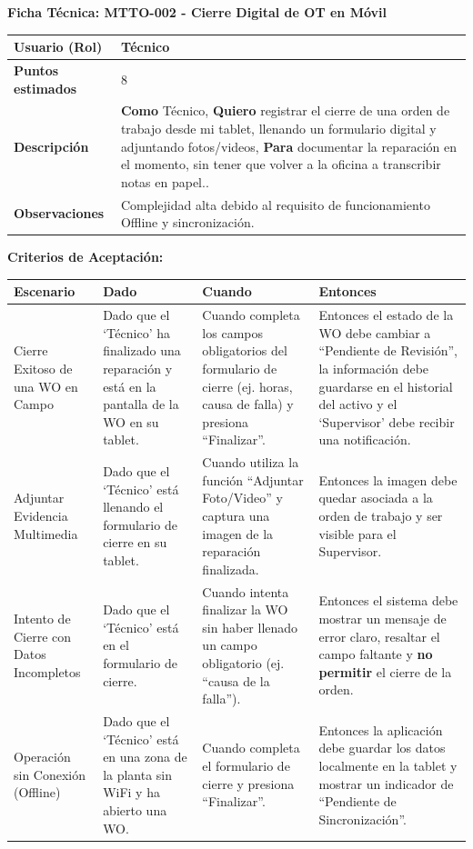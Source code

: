 \noindent
\textbf{Ficha Técnica: MTTO-002 - Cierre Digital de OT en Móvil}
\footnotesize
\begin{longtable}{|p{}|p{}|}
\hline
\textbf{Usuario (Rol)} & Técnico \\ \hline
\textbf{Puntos estimados} & 8 \\ \hline
\textbf{Descripción} & \textbf{Como} Técnico, \textbf{Quiero} registrar el cierre de una orden de trabajo desde mi tablet, llenando un formulario digital y adjuntando fotos/videos, \textbf{Para} documentar la reparación en el momento, sin tener que volver a la oficina a transcribir notas en papel.. \\ \hline
\textbf{Observaciones} & Complejidad alta debido al requisito de funcionamiento Offline y sincronización. \\ \hline
\end{longtable}
\normalsize

\noindent
\textbf{Criterios de Aceptación:}
\footnotesize
\begin{longtable}{|p{}|p{}|p{}|p{}|}
\hline
\textbf{Escenario} & \textbf{Dado} & \textbf{Cuando} & \textbf{Entonces} \\ \hline
\endhead
Cierre Exitoso de una WO en Campo & Dado que el `Técnico' ha finalizado una reparación y está en la pantalla de la WO en su tablet. & Cuando completa los campos obligatorios del formulario de cierre (ej. horas, causa de falla) y presiona ``Finalizar''. & Entonces el estado de la WO debe cambiar a ``Pendiente de Revisión'', la información debe guardarse en el historial del activo y el `Supervisor' debe recibir una notificación. \\ \hline
Adjuntar Evidencia Multimedia & Dado que el `Técnico' está llenando el formulario de cierre en su tablet. & Cuando utiliza la función ``Adjuntar Foto/Video'' y captura una imagen de la reparación finalizada. & Entonces la imagen debe quedar asociada a la orden de trabajo y ser visible para el Supervisor. \\ \hline
Intento de Cierre con Datos Incompletos & Dado que el `Técnico' está en el formulario de cierre. & Cuando intenta finalizar la WO sin haber llenado un campo obligatorio (ej. ``causa de la falla''). & Entonces el sistema debe mostrar un mensaje de error claro, resaltar el campo faltante y \textbf{no permitir} el cierre de la orden. \\ \hline
Operación sin Conexión (Offline) & Dado que el `Técnico' está en una zona de la planta sin WiFi y ha abierto una WO. & Cuando completa el formulario de cierre y presiona ``Finalizar''. & Entonces la aplicación debe guardar los datos localmente en la tablet y mostrar un indicador de ``Pendiente de Sincronización''. \\ \hline
\end{longtable}
\normalsize

